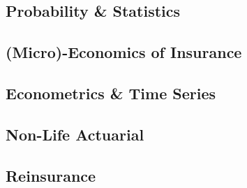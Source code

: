 \documentclass[french,a4paper]{article}
\theoremstyle{sansparenthese}
\begin{document}
\newpage
\begin{center}
    \section*{Probability \& Statistics}
    \medskip
\end{center}

\begin{multicols}{2}


\end{multicols}

\newpage


\newpage

\begin{center}
    \section*{(Micro)-Economics of Insurance}
    \medskip
\end{center}


\begin{multicols}{2}
	
\end{multicols}

\newpage
\begin{center}
	\section*{Econometrics \& Time Series}
	\medskip
\end{center}


\begin{multicols}{2}
	
\end{multicols}

\newpage


\begin{center}
	\section*{Non-Life Actuarial}
	\medskip
\end{center}

\begin{multicols}{2}	
	
\end{multicols}

\newpage

\begin{center}
	\section*{Reinsurance}
	\medskip
\end{center}
\end{document}
